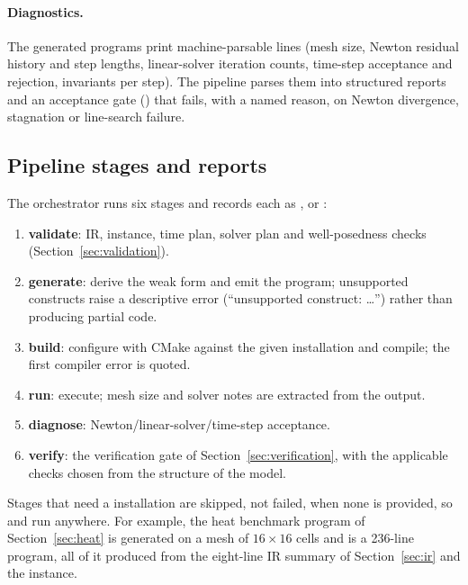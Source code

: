 \paragraph{Diagnostics.} The generated programs print machine-parsable lines (mesh size, Newton residual history and step lengths, linear-solver iteration counts, time-step acceptance and rejection, invariants per step). The pipeline parses them into structured reports and an acceptance gate () that fails, with a named reason, on Newton divergence, stagnation or line-search failure.

\subsection{Pipeline stages and reports}
The orchestrator runs six stages and records each as ,  or :
\begin{enumerate}[nosep]
\item \textbf{validate}: IR, instance, time plan, solver plan and well-posedness checks (Section~\ref{sec:validation}).
\item \textbf{generate}: derive the weak form and emit the program; unsupported constructs raise a descriptive error (``unsupported construct: \ldots'') rather than producing partial code.
\item \textbf{build}: configure with CMake against the given \dealii{} installation and compile; the first compiler error is quoted.
\item \textbf{run}: execute; mesh size and solver notes are extracted from the output.
\item \textbf{diagnose}: Newton/linear-solver/time-step acceptance.
\item \textbf{verify}: the verification gate of Section~\ref{sec:verification}, with the applicable checks chosen from the structure of the model.
\end{enumerate}
Stages that need a \dealii{} installation are skipped, not failed, when none is provided, so  and  run anywhere. For example, the heat benchmark program of Section~\ref{sec:heat} is generated on a mesh of $16\times16$ cells and is a 236-line \dealii{} program, all of it produced from the eight-line IR summary of Section~\ref{sec:ir} and the instance.

